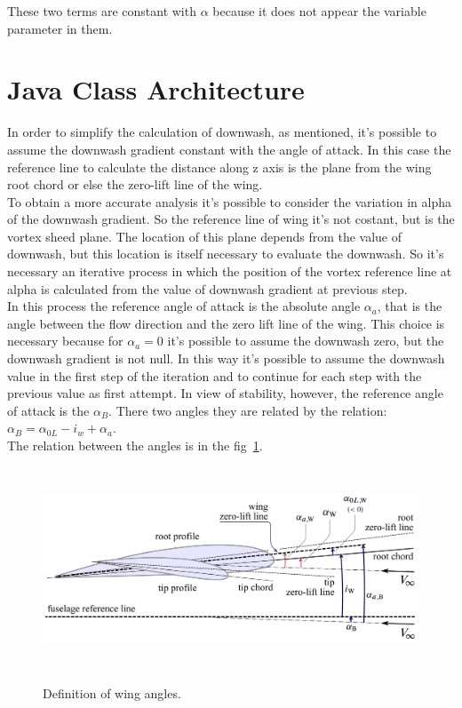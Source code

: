 These two terms are constant with $\alpha$ because  it does not appear the variable parameter in them.


\section{Java Class Architecture}

In order to simplify the calculation of downwash, as mentioned, it's possible to assume the downwash gradient constant with the angle of attack. In this case the reference line to calculate the distance along z axis is the plane from the wing root chord or else the zero-lift line of the wing.\\
To obtain a more accurate analysis it's possible to consider the variation in alpha of the downwash gradient. So the reference line of wing it's not costant, but is the vortex sheed plane. The location of this plane depends from the value of downwash, but this location is itself necessary to evaluate the downwash. So it's necessary an iterative process in which the position of the vortex reference line at alpha is calculated from the value of downwash gradient at previous step.\\ 

In this process the reference angle of attack is the absolute angle $\alpha_a$, that is the angle between the flow direction and the zero lift line of the wing. This choice is necessary because for $\alpha_a = 0$ it's possible to assume the downwash zero, but the downwash gradient is not null. In this way it's possible to assume the downwash value in the first step of the iteration and to continue for each step with the previous value as first attempt.
In view of stability, however, the reference angle of attack is the $\alpha_B$. There two angles they are related by the relation: $ \alpha_B =\alpha_{0L} - i_w + \alpha_a $. \\The relation between the angles is in the fig~\ref{angles}.

\begin{figure}[H]
\centering
{\includegraphics[height=6cm]{Immagini/Wing_Alpha_Zero_List.pdf}} 
\caption{Definition of wing angles.}
\label{angles}
\end{figure} 


